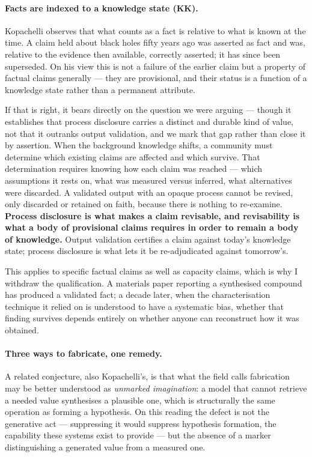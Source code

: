 \paragraph{Facts are indexed to a knowledge state (KK).} Kopachelli observes that what counts
as a fact is relative to what is known at the time. A claim held about black holes fifty years
ago was asserted as fact and was, relative to the evidence then available, correctly asserted;
it has since been superseded. On his view this is not a failure of the earlier claim but a
property of factual claims generally --- they are provisional, and their status is a function
of a knowledge state rather than a permanent attribute.

If that is right, it bears directly on the question we were arguing --- though it establishes
that process disclosure carries a distinct and durable kind of value, not that it outranks
output validation, and we mark that gap rather than close it by assertion. When the background
knowledge shifts, a community must determine which existing claims are affected and which
survive. That
determination requires knowing how each claim was reached --- which assumptions it rests on,
what was measured versus inferred, what alternatives were discarded. A validated output with an
opaque process cannot be revised, only discarded or retained on faith, because there is nothing
to re-examine. \textbf{Process disclosure is what makes a claim revisable, and revisability is
what a body of provisional claims requires in order to remain a body of knowledge.} Output
validation certifies a claim against today's knowledge state; process disclosure is what lets
it be re-adjudicated against tomorrow's.

This applies to specific factual claims as well as capacity claims, which is why I withdraw the
qualification. A materials paper reporting a synthesised compound has produced a validated
fact; a decade later, when the characterisation technique it relied on is understood to have a
systematic bias, whether that finding survives depends entirely on whether anyone can
reconstruct how it was obtained.

\paragraph{Three ways to fabricate, one remedy.} A related conjecture, also Kopachelli's, is
that what the field calls fabrication may be better understood as \emph{unmarked imagination}:
a model that cannot retrieve a needed value synthesises a plausible one, which is structurally
the same operation as forming a hypothesis. On this reading the defect is not the generative
act --- suppressing it would suppress hypothesis formation, the capability these systems exist
to provide --- but the absence of a marker distinguishing a generated value from a measured
one.

